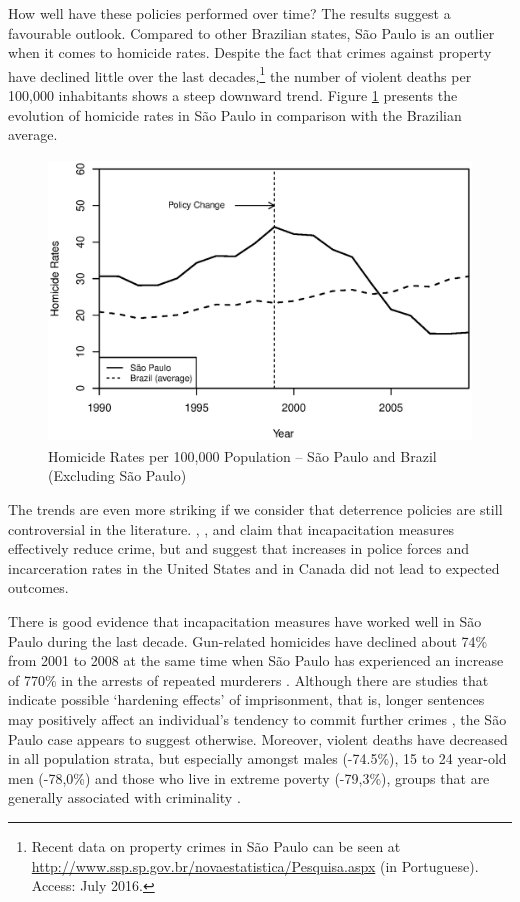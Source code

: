 How well have these policies performed over time? The results suggest a favourable outlook. Compared to other Brazilian states, São Paulo is an outlier when it comes to homicide rates. Despite the fact that crimes against property have declined little over the last decades,\footnote{Recent data on property crimes in São Paulo can be seen at \url{http://www.ssp.sp.gov.br/novaestatistica/Pesquisa.aspx} (in Portuguese). Access: July 2016.} the number of violent deaths per 100,000 inhabitants shows a steep downward trend. Figure \ref{fig:figure1} presents the evolution of homicide rates in São Paulo in comparison with the Brazilian average.

\begin{figure}[H]
    \centering
    \includegraphics[height=7.5cm]{images/br.eps}
    \caption{Homicide Rates per 100,000 Population -- São Paulo and Brazil (Excluding São Paulo)}
    \label{fig:figure1}
\end{figure}

The trends are even more striking if we consider that deterrence policies are still controversial in the literature. \citet{barbarino2014incapacitation}, \citet{buonanno2013incarceration}, \citet{levitt1996effect,levitt2004understanding} and \citet{owens2009more} claim that incapacitation measures effectively reduce crime, but \citet{eck2006have} and \citet{beattie2007police} suggest that increases in police forces and incarceration rates in the United States and in Canada did not lead to expected outcomes. 

There is good evidence that incapacitation measures have worked well in São Paulo during the last decade. Gun-related homicides have declined about 74\% from 2001 to 2008 \citep{peres2011queda} at the same time when São Paulo has experienced an increase of 770\% in the arrests of repeated murderers \citep[36]{manso2012homicidos}. Although there are studies that indicate possible `hardening effects' of imprisonment, that is, longer sentences may positively affect an individual's tendency to commit further crimes \citep[e.g.][]{chen2007harsher,glaeser1996crime,western2001labor}, the São Paulo case appears to suggest otherwise. Moreover, violent deaths have decreased in all population strata, but especially amongst males (-74.5\%), 15 to 24 year-old men (-78,0\%) and those who live in extreme poverty (-79,3\%), groups that are generally associated with criminality \citep{peres2011queda}.

